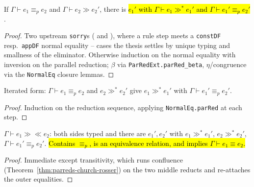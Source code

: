 \begin{theorem}
\label{thm:normaleq-parred}
\leanok
{}

 If $\Gamma\vdash e_1\equiv_p e_2$ and $\Gamma\vdash e_2\gg e_2'$, there is
\hl{$e_1'$ with $\Gamma\vdash e_1\gg^* e_1'$ and $\Gamma\vdash e_1'\equiv_p e_2'$}.
\end{theorem}
\begin{proof}
\stSorry{}  Two upstream \texttt{sorry}s
( and
), where a rule step meets a
\texttt{constDF} resp.\ \texttt{appDF} normal equality -- cases the thesis settles by unique
typing and smallness of the eliminator.
 Otherwise induction on the normal equality with inversion on the parallel
reduction; $\beta$ via \texttt{ParRedExt.parRed\_beta}, $\eta$/congruence via the
\texttt{NormalEq} closure lemmas.
\end{proof}

\begin{lemma}
\label{thm:normaleq-parreds}
\leanok
{}

 Iterated form: $\Gamma\vdash e_1\equiv_p e_2$ and $e_2\gg^* e_2'$ give
$e_1\gg^* e_1'$ with $\Gamma\vdash e_1'\equiv_p e_2'$.
\end{lemma}
\begin{proof}
\leanok
{} Induction on the reduction sequence, applying \texttt{NormalEq.parRed} at each
step.
\end{proof}

\begin{lemma}
\label{def:crdefeq}
\leanok
{}

 $\Gamma\vdash e_1\gg\ll e_2$: both sides typed and there are $e_1',e_2'$ with
$e_1\gg^* e_1'$, $e_2\gg^* e_2'$, $\Gamma\vdash e_1'\equiv_p e_2'$. \hl{Contains $\equiv_p$, is
an equivalence relation, and implies $\Gamma\vdash e_1\equiv e_2$.}
\end{lemma}
\begin{proof}
\leanok
{} Immediate except transitivity, which runs confluence
(Theorem~\ref{thm:parreds-church-rosser}) on the two middle reducts and re-attaches the outer
equalities.
\end{proof}

